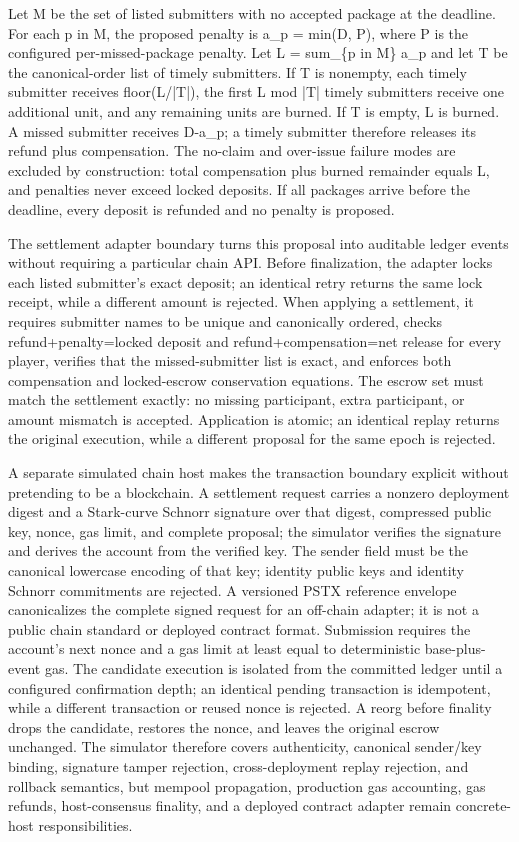 \documentclass[11pt]{article}
\begin{document}
Let M be the set of listed submitters with no accepted package at the deadline. For each p in M, the proposed penalty is a\_p = min(D, P), where P is the configured per-missed-package penalty. Let L = sum\_\{p in M\} a\_p and let T be the canonical-order list of timely submitters. If T is nonempty, each timely submitter receives floor(L/|T|), the first L mod |T| timely submitters receive one additional unit, and any remaining units are burned. If T is empty, L is burned. A missed submitter receives D-a\_p; a timely submitter therefore releases its refund plus compensation. The no-claim and over-issue failure modes are excluded by construction: total compensation plus burned remainder equals L, and penalties never exceed locked deposits. If all packages arrive before the deadline, every deposit is refunded and no penalty is proposed.

The settlement adapter boundary turns this proposal into auditable ledger events without requiring a particular chain API. Before finalization, the adapter locks each listed submitter’s exact deposit; an identical retry returns the same lock receipt, while a different amount is rejected. When applying a settlement, it requires submitter names to be unique and canonically ordered, checks refund+penalty=locked deposit and refund+compensation=net release for every player, verifies that the missed-submitter list is exact, and enforces both compensation and locked-escrow conservation equations. The escrow set must match the settlement exactly: no missing participant, extra participant, or amount mismatch is accepted. Application is atomic; an identical replay returns the original execution, while a different proposal for the same epoch is rejected.

A separate simulated chain host makes the transaction boundary explicit without pretending to be a blockchain. A settlement request carries a nonzero deployment digest and a Stark-curve Schnorr signature over that digest, compressed public key, nonce, gas limit, and complete proposal; the simulator verifies the signature and derives the account from the verified key. The sender field must be the canonical lowercase encoding of that key; identity public keys and identity Schnorr commitments are rejected. A versioned PSTX reference envelope canonicalizes the complete signed request for an off-chain adapter; it is not a public chain standard or deployed contract format. Submission requires the account’s next nonce and a gas limit at least equal to deterministic base-plus-event gas. The candidate execution is isolated from the committed ledger until a configured confirmation depth; an identical pending transaction is idempotent, while a different transaction or reused nonce is rejected. A reorg before finality drops the candidate, restores the nonce, and leaves the original escrow unchanged. The simulator therefore covers authenticity, canonical sender/key binding, signature tamper rejection, cross-deployment replay rejection, and rollback semantics, but mempool propagation, production gas accounting, gas refunds, host-consensus finality, and a deployed contract adapter remain concrete-host responsibilities.
\end{document}
